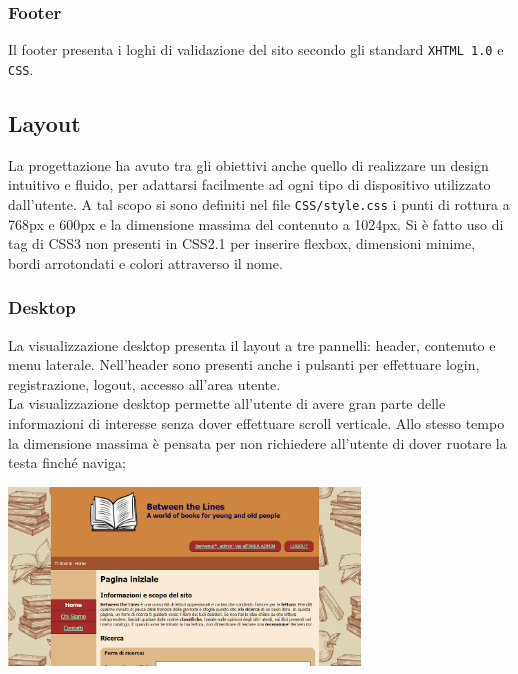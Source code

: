 \documentclass[12pt,a4paper,headings=optiontohead]{article}
\begin{document}
	
	
	
	
	
	\subsubsection{Footer}
	
	Il footer presenta i loghi di validazione del sito secondo gli standard \texttt{XHTML 1.0} e \texttt{CSS}.
	
	
	\subsection{Layout}
	La progettazione ha avuto tra gli obiettivi anche quello di realizzare un design intuitivo e fluido, per adattarsi facilmente ad ogni tipo di dispositivo utilizzato dall'utente.
	A tal scopo si sono definiti nel file \texttt{CSS/style.css} i punti di rottura a 768px e 600px e la dimensione massima del contenuto a 1024px.
	Si è fatto uso di tag di CSS3 non presenti in CSS2.1 per inserire flexbox, dimensioni minime, bordi arrotondati e colori attraverso il nome.
	
	
	\subsubsection{Desktop}
	La visualizzazione desktop presenta il layout a tre pannelli: header, contenuto e menu laterale. Nell'header sono presenti anche i pulsanti per effettuare login, registrazione, logout, accesso all'area utente.\\
	La visualizzazione desktop permette all'utente di avere gran parte delle informazioni di interesse senza dover effettuare scroll verticale. Allo stesso tempo la dimensione massima è pensata per non richiedere all'utente di dover ruotare la testa finché naviga;
	\begin{center}
	\includegraphics[width=0.7\textwidth]{../img/layout_relazione/desktop.png}
	\end{center}
\end{document}
